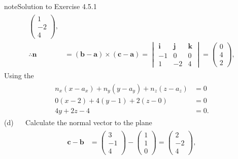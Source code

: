 \documentclass[letterpaper,10pt,english]{jupyterBook}
\begin{document}
\begin{sphinxadmonition}{note}{Solution to Exercise 4.5.1}
\begin{equation*}
\begin{split}
\begin{align*}
    \begin{pmatrix} 1 \\ -2 \\ 4 \end{pmatrix}, \\
    \therefore \mathbf{n} &= (\mathbf{b} - \mathbf{a}) \times (\mathbf{c} - \mathbf{a}) = 
    \begin{vmatrix} 
        \mathbf{i} & \mathbf{j} & \mathbf{k} \\
        -1 & 0 & 0 \\
        1 & -2 & 4 
    \end{vmatrix} =
    \begin{pmatrix} 0 \\ 4 \\ 2 \end{pmatrix},
\end{align*} \end{split}
\end{equation*}
\sphinxAtStartPar
Using the {\hyperref[\detokenize{_pages/4.2_Planes:point-normal-definition}]{}}
\begin{equation*}
\begin{split} \begin{align*}
    n_x(x - a_x) + n_y(y - a_y) + n_z(z - a_z) &= 0 \\
    0(x - 2) + 4(y - 1) + 2(z - 0) &= 0 \\
    4 y + 2 z - 4 &= 0.
\end{align*} \end{split}
\end{equation*}
\sphinxAtStartPar
(d)   Calculate the normal vector to the plane
\begin{equation*}
\begin{split} \begin{align*}
    \mathbf{c} - \mathbf{b} &= \begin{pmatrix} 3 \\ -1 \\ 4 \end{pmatrix} - 
    \begin{pmatrix} 1 \\ 1 \\ 0 \end{pmatrix} =
    \begin{pmatrix} 2 \\ -2 \\ 4 \end{pmatrix}, \\

\end{align*}
\end{split}
\end{equation*}
\end{sphinxadmonition}
\end{document}
